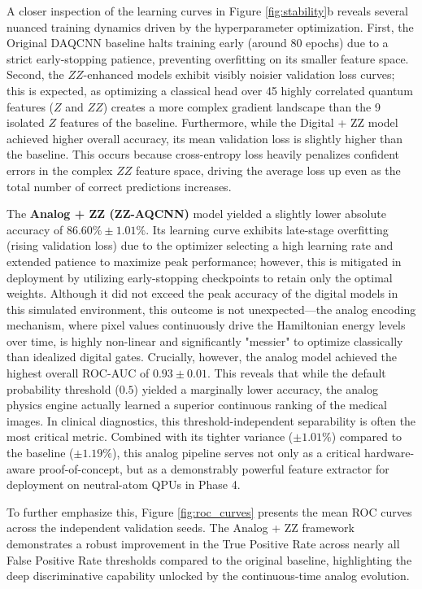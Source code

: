 \documentclass{oqireport}
\begin{document}
A closer inspection of the learning curves in Figure \ref{fig:stability}b reveals several nuanced training dynamics driven by the hyperparameter optimization. First, the Original DAQCNN baseline halts training early (around 80 epochs) due to a strict early-stopping patience, preventing overfitting on its smaller feature space. Second, the $ZZ$-enhanced models exhibit visibly noisier validation loss curves; this is expected, as optimizing a classical head over 45 highly correlated quantum features ($Z$ and $ZZ$) creates a more complex gradient landscape than the 9 isolated $Z$ features of the baseline. Furthermore, while the Digital + ZZ model achieved higher overall accuracy, its mean validation loss is slightly higher than the baseline. This occurs because cross-entropy loss heavily penalizes confident errors in the complex $ZZ$ feature space, driving the average loss up even as the total number of correct predictions increases. 

The \textbf{Analog + ZZ (ZZ-AQCNN)} model yielded a slightly lower absolute accuracy of $86.60\% \pm 1.01\%$. Its learning curve exhibits late-stage overfitting (rising validation loss) due to the optimizer selecting a high learning rate and extended patience to maximize peak performance; however, this is mitigated in deployment by utilizing early-stopping checkpoints to retain only the optimal weights. Although it did not exceed the peak accuracy of the digital models in this simulated environment, this outcome is not unexpected---the analog encoding mechanism, where pixel values continuously drive the Hamiltonian energy levels over time, is highly non-linear and significantly "messier" to optimize classically than idealized digital gates. Crucially, however, the analog model achieved the highest overall ROC-AUC of $0.93 \pm 0.01$. This reveals that while the default probability threshold ($0.5$) yielded a marginally lower accuracy, the analog physics engine actually learned a superior continuous ranking of the medical images. In clinical diagnostics, this threshold-independent separability is often the most critical metric. Combined with its tighter variance ($\pm 1.01\%$) compared to the baseline ($\pm 1.19\%$), this analog pipeline serves not only as a critical hardware-aware proof-of-concept, but as a demonstrably powerful feature extractor for deployment on neutral-atom QPUs in Phase 4.

To further emphasize this, Figure \ref{fig:roc_curves} presents the mean ROC curves across the independent validation seeds. The Analog + ZZ framework demonstrates a robust improvement in the True Positive Rate across nearly all False Positive Rate thresholds compared to the original baseline, highlighting the deep discriminative capability unlocked by the continuous-time analog evolution.
\end{document}
